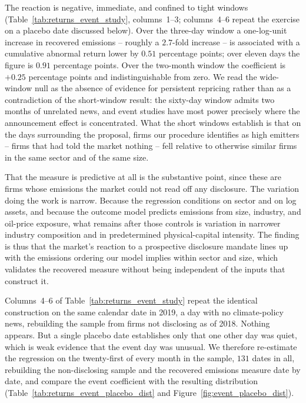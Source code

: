 \documentclass[a4paper,12pt]{article}
\begin{document}
The reaction is negative, immediate, and confined to tight windows (Table~\ref{tab:returns_event_study}, columns~1--3; columns~4--6 repeat the exercise on a placebo date discussed below). Over the three-day window a one-log-unit increase in recovered emissions -- roughly a $2.7$-fold increase -- is associated with a cumulative abnormal return lower by $0.51$ percentage points; over eleven days the figure is $0.91$ percentage points. Over the two-month window the coefficient is $+0.25$ percentage points and indistinguishable from zero. We read the wide-window null as the absence of evidence for persistent repricing rather than as a contradiction of the short-window result: the sixty-day window admits two months of unrelated news, and event studies have most power precisely where the announcement effect is concentrated. What the short windows establish is that on the days surrounding the proposal, firms our procedure identifies as high emitters -- firms that had told the market nothing -- fell relative to otherwise similar firms in the same sector and of the same size.

That the measure is predictive at all is the substantive point, since these are firms whose emissions the market could not read off any disclosure. The variation doing the work is narrow. Because the regression conditions on sector and on log assets, and because the outcome model predicts emissions from size, industry, and oil-price exposure, what remains after those controls is variation in narrower industry composition and in predetermined physical-capital intensity. The finding is thus that the market's reaction to a prospective disclosure mandate lines up with the emissions ordering our model implies within sector and size, which validates the recovered measure without being independent of the inputs that construct it.

Columns~4--6 of Table~\ref{tab:returns_event_study} repeat the identical construction on the same calendar date in 2019, a day with no climate-policy news, rebuilding the sample from firms not disclosing as of 2018. Nothing appears. But a single placebo date establishes only that one other day was quiet, which is weak evidence that the event day was unusual. We therefore re-estimate the regression on the twenty-first of every month in the sample, $131$ dates in all, rebuilding the non-disclosing sample and the recovered emissions measure date by date, and compare the event coefficient with the resulting distribution (Table~\ref{tab:returns_event_placebo_dist} and Figure~\ref{fig:event_placebo_dist}). 
\end{document}
